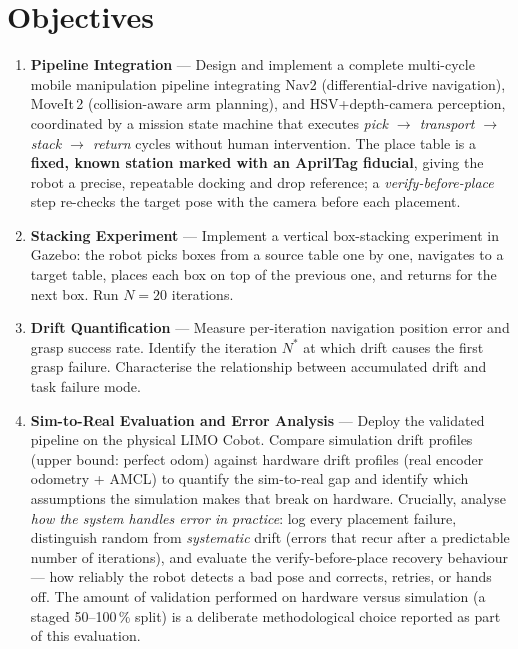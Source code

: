 \documentclass[11pt,a4paper]{article}
\begin{document}
\section{Objectives}
\begin{enumerate}[label=\textbf{\arabic*.}]
    \item \textbf{Pipeline Integration} --- Design and implement a complete multi-cycle
    mobile manipulation pipeline integrating Nav2 (differential-drive navigation),
    MoveIt\,2 (collision-aware arm planning), and HSV+depth-camera perception,
    coordinated by a mission state machine that executes \emph{pick $\to$ transport $\to$
    stack $\to$ return} cycles without human intervention. The place table is a
    \textbf{fixed, known station marked with an AprilTag fiducial}, giving the robot a
    precise, repeatable docking and drop reference; a \emph{verify-before-place} step
    re-checks the target pose with the camera before each placement.
    \item \textbf{Stacking Experiment} --- Implement a vertical box-stacking experiment
    in Gazebo: the robot picks boxes from a source table one by one, navigates to a
    target table, places each box on top of the previous one, and returns for the next
    box. Run $N = 20$ iterations.
    \item \textbf{Drift Quantification} --- Measure per-iteration navigation position
    error and grasp success rate. Identify the iteration $N^*$ at which drift causes
    the first grasp failure. Characterise the relationship between accumulated drift and
    task failure mode.
    \item \textbf{Sim-to-Real Evaluation and Error Analysis} --- Deploy the validated
    pipeline on the physical LIMO Cobot. Compare simulation drift profiles (upper bound:
    perfect odom) against hardware drift profiles (real encoder odometry + AMCL) to
    quantify the sim-to-real gap and identify which assumptions the simulation makes that
    break on hardware. Crucially, analyse \emph{how the system handles error in
    practice}: log every placement failure, distinguish random from \emph{systematic}
    drift (errors that recur after a predictable number of iterations), and evaluate the
    verify-before-place recovery behaviour --- how reliably the robot detects a bad pose
    and corrects, retries, or hands off. The amount of validation performed on hardware
    versus simulation (a staged 50--100\,\% split) is a deliberate methodological choice
    reported as part of this evaluation.
\end{enumerate}
\end{document}
